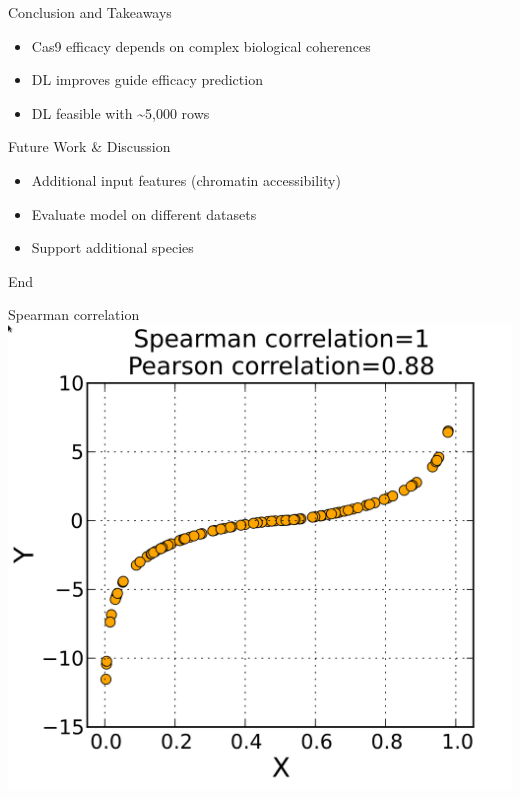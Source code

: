 \documentclass[Nike]{tuberlinbeamer}
\begin{document}
\begin{frame}{Conclusion and Takeaways}
  \begin{itemize}
    \item Cas9 efficacy depends on complex biological coherences %
    \item DL improves guide efficacy prediction %
    \item DL feasible with \textasciitilde5,000 rows
  \end{itemize}

\end{frame}


\begin{frame}{Future Work \& Discussion}
  \begin{itemize}
    \item Additional input features (chromatin accessibility)
    \item Evaluate model on different datasets
    \item Support additional species
  \end{itemize}
\end{frame}

\begin{frame}{End}
\end{frame}

\begin{frame}{Spearman correlation}
  \includegraphics[width=0.50\linewidth]{./Spearman1.png}
\end{frame}
\end{document}
